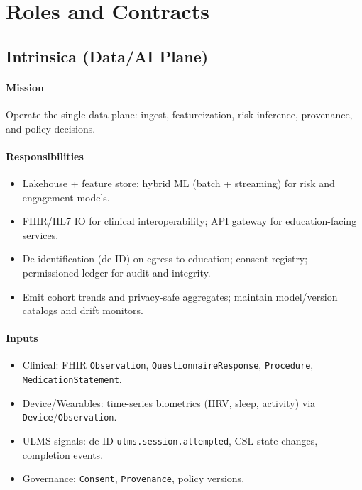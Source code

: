 \documentclass[11pt]{article}
\theoremstyle{plain}
\begin{document}
\section{Roles and Contracts}

\subsection{Intrinsica (Data/AI Plane)}

\paragraph{Mission}
Operate the single data plane: ingest, featureization, risk inference, provenance, and policy decisions.

\paragraph{Responsibilities}
\begin{itemize}
  \item Lakehouse + feature store; hybrid ML (batch + streaming) for risk and engagement models.
  \item FHIR/HL7 IO for clinical interoperability; API gateway for education-facing services.
  \item De-identification (de-ID) on egress to education; consent registry; permissioned ledger for audit and integrity.
  \item Emit cohort trends and privacy-safe aggregates; maintain model/version catalogs and drift monitors.
\end{itemize}

\paragraph{Inputs}
\begin{itemize}
  \item Clinical: FHIR \texttt{Observation}, \texttt{QuestionnaireResponse}, \texttt{Procedure}, \texttt{MedicationStatement}.
  \item Device/Wearables: time-series biometrics (HRV, sleep, activity) via \texttt{Device}/\texttt{Observation}.
  \item ULMS signals: de-ID \texttt{ulms.session.attempted}, CSL state changes, completion events.
  \item Governance: \texttt{Consent}, \texttt{Provenance}, policy versions.
\end{itemize}
\end{document}
